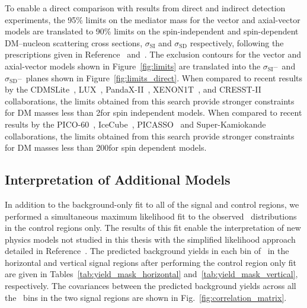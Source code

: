To enable a direct comparison with results from direct and indirect detection experiments, the 95\% \CL limits on the mediator mass for the vector and axial-vector models are translated to 90\% \CL limits on the spin-independent and spin-dependent DM--nucleon scattering cross sections, $\sigma_{\text{SI}}$ and $\sigma_{\text{SD}}$ respectively, following the prescriptions given in Reference~\cite{Boveia:2016mrp} and~\cite{DMF2015}.
The exclusion contours for the vector and axial-vector models shown in Figure~\ref{fig:limits} are translated into the $\sigma_{\text{SI}}$--\mdm\ and $\sigma_{\text{SD}}$--\mdm\ planes shown in Figure~\ref{fig:limits_direct}. 
When compared to recent results by the CDMSLite~\cite{CDMS2016}, LUX~\cite{LUX2017}, PandaX-II~\cite{Cui:2017}, XENON1T~\cite{Aprile:2018}, and CRESST-II~\cite{Angloher:2015ewa} collaborations, the limits obtained from this search provide stronger constraints for DM masses less than 2\GeV for spin independent models.
When compared to recent results by the PICO-60~\cite{PICO2017}, IceCube~\cite{IceCube2016}, PICASSO~\cite{Behnke:2016lsk} and Super-Kamiokande~\cite{Choi:2015ara} collaborations, the limits obtained from this search provide stronger constraints for DM masses less than 200\GeV for spin dependent models.

\subsection{Interpretation of Additional Models}
\label{sec:reinterpretation}

In addition to the background-only fit to all of the signal and control regions, we performed a simultaneous maximum likelihood fit to the observed \ETg\ distributions in the control regions only.
The results of this fit enable the interpretation of new physics models not studied in this thesis with the simplified likelihood approach detailed in Reference~\cite{CMS-NOTE-2017-001}.
The predicted background yields in each bin of \ETg\ in the horizontal and vertical signal regions after performing the control region only fit are given in Tables~\ref{tab:yield_mask_horizontal} and~\ref{tab:yield_mask_vertical}, respectively.
The covariances between the predicted background yields across all the \ETg~bins in the two signal regions are shown in Fig.~\ref{fig:correlation_matrix}.

